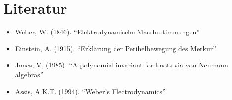 \section{Literatur}
\begin{itemize}
    \item Weber, W. (1846). \enquote{Elektrodynamische Massbestimmungen}
    \item Einstein, A. (1915). \enquote{Erklärung der Perihelbewegung des Merkur}
    \item Jones, V. (1985). \enquote{A polynomial invariant for knots via von Neumann algebras}
    \item Assis, A.K.T. (1994). \enquote{Weber's Electrodynamics}
\end{itemize}
